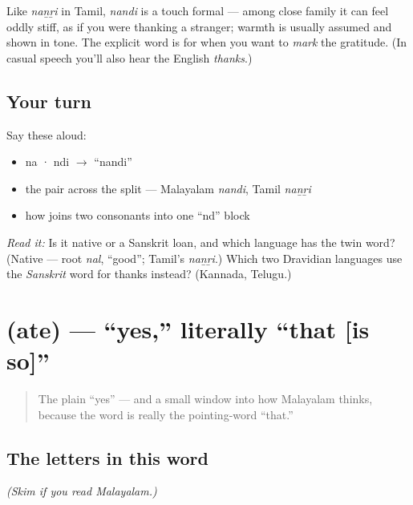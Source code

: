 \begin{culture}
Like \emph{naṉṟi} in Tamil, \emph{nandi} is a touch formal — among close family it can feel oddly stiff, as if you were thanking a stranger; warmth is usually assumed and shown in tone. The explicit word is for when you want to \emph{mark} the gratitude. (In casual speech you'll also hear the English \emph{thanks}.)
\end{culture}

\subsection*{Your turn}
Say these aloud:

\begin{itemize}
\raggedright
  \item na · ndi $\to$ \textquotedblleft{}nandi\textquotedblright{}
  \item the pair across the split — Malayalam \emph{nandi}, Tamil \emph{naṉṟi}
  \item how  joins two consonants into one \textquotedblleft{}nd\textquotedblright{} block
\end{itemize}

\begin{tcolorbox}[breakable,colback=teal!4,colframe=teal!35!black,title={Before you move on}]
\emph{Read it:} \textbf{} Is it native or a Sanskrit loan, and which language has the twin word? (Native — root \emph{nal}, \textquotedblleft{}good\textquotedblright{}; Tamil's \emph{naṉṟi}.) Which two Dravidian languages use the \emph{Sanskrit} word for thanks instead? (Kannada, Telugu.)
\end{tcolorbox}
\section[\texorpdfstring{\ml{അതെ} (ate)}{അതെ (ate)}]{ (ate) — \textquotedblleft{}yes,\textquotedblright{} literally \textquotedblleft{}that {[}is so{]}\textquotedblright{}}

\label{lesson:ML-C01-athe}



\begin{quote}
The plain \textquotedblleft{}yes\textquotedblright{} — and a small window into how Malayalam thinks, because the word is really the pointing-word \textquotedblleft{}that.\textquotedblright{}
\end{quote}

\subsection*{The letters in this word}
\emph{(Skim if you read Malayalam.)}

